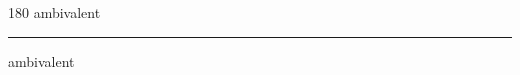 
\begin{frame}
\begin{center}
\begin{turn}{180}
{\fontsize{2.5cm}{1em}\selectfont ambivalent}
\end{turn}
\vspace{1em}\par  
\hrule
\vspace{1em}\par  
{\fontsize{2.5cm}{1em}\selectfont ambivalent}
\end{center}
\end{frame}
